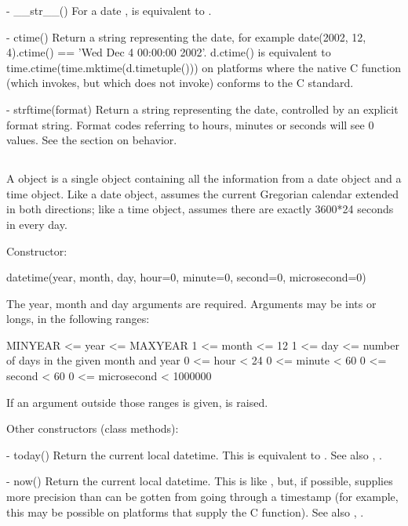   - __str__()
    For a date ,  is equivalent to
    .

  - ctime()
    Return a string representing the date, for example
    date(2002, 12, 4).ctime() == 'Wed Dec  4 00:00:00 2002'.
    d.ctime() is equivalent to time.ctime(time.mktime(d.timetuple()))
    on platforms where the native C  function
    (which  invokes, but which
     does not invoke) conforms to the C standard.

  - strftime(format)
    Return a string representing the date, controlled by an explicit
    format string.  Format codes referring to hours, minutes or seconds
    will see 0 values.
    See the section on  behavior.


\subsection{ \label{datetime-datetime}}

A  object is a single object containing all the
information from a date object and a time object.  Like a date object,
 assumes the current Gregorian calendar extended in
both directions; like a time object,  assumes there
are exactly 3600*24 seconds in every day.

Constructor:

    datetime(year, month, day,
             hour=0, minute=0, second=0, microsecond=0)

    The year, month and day arguments are required.  Arguments may be ints
    or longs, in the following ranges:

        MINYEAR <= year <= MAXYEAR
        1 <= month <= 12
        1 <= day <= number of days in the given month and year
        0 <= hour < 24
        0 <= minute < 60
        0 <= second < 60
        0 <= microsecond < 1000000

    If an argument outside those ranges is given,
     is raised.

Other constructors (class methods):

  - today()
    Return the current local datetime.  This is equivalent to
    .
    See also , .

  - now()
    Return the current local datetime.  This is like ,
    but, if possible, supplies more precision than can be gotten from
    going through a  timestamp (for example,
    this may be possible on platforms that supply the C
     function).
    See also , .

